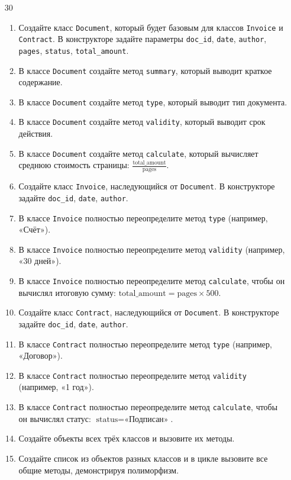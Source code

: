 \begin{enumerate}
\begin{enumerate}[leftmargin=*]
\end{enumerate}
\item[30]
\begin{enumerate}[leftmargin=*]
    \item Создайте класс \texttt{Document}, который будет базовым для классов \texttt{Invoice} и \texttt{Contract}. В конструкторе задайте параметры \texttt{doc\_id}, \texttt{date}, \texttt{author}, \texttt{pages}, \texttt{status}, \texttt{total\_amount}.
    \item В классе \texttt{Document} создайте метод \texttt{summary}, который выводит краткое содержание.
    \item В классе \texttt{Document} создайте метод \texttt{type}, который выводит тип документа.
    \item В классе \texttt{Document} создайте метод \texttt{validity}, который выводит срок действия.
    \item В классе \texttt{Document} создайте метод \texttt{calculate}, который вычисляет среднюю стоимость страницы: \( \frac{\text{total\_amount}}{\text{pages}} \).
    \item Создайте класс \texttt{Invoice}, наследующийся от \texttt{Document}. В конструкторе задайте \texttt{doc\_id}, \texttt{date}, \texttt{author}.
    \item В классе \texttt{Invoice} полностью переопределите метод \texttt{type} (например, «Счёт»).
    \item В классе \texttt{Invoice} полностью переопределите метод \texttt{validity} (например, «30 дней»).
    \item В классе \texttt{Invoice} полностью переопределите метод \texttt{calculate}, чтобы он вычислял итоговую сумму: \( \text{total\_amount} = \text{pages} \times 500 \).
    \item Создайте класс \texttt{Contract}, наследующийся от \texttt{Document}. В конструкторе задайте \texttt{doc\_id}, \texttt{date}, \texttt{author}.
    \item В классе \texttt{Contract} полностью переопределите метод \texttt{type} (например, «Договор»).
    \item В классе \texttt{Contract} полностью переопределите метод \texttt{validity} (например, «1 год»).
    \item В классе \texttt{Contract} полностью переопределите метод \texttt{calculate}, чтобы он вычислял статус: \( \text{status} = \text{«Подписан»} \).
    \item Создайте объекты всех трёх классов и вызовите их методы.
    \item Создайте список из объектов разных классов и в цикле вызовите все общие методы, демонстрируя полиморфизм.

\end{enumerate}
\end{enumerate}
